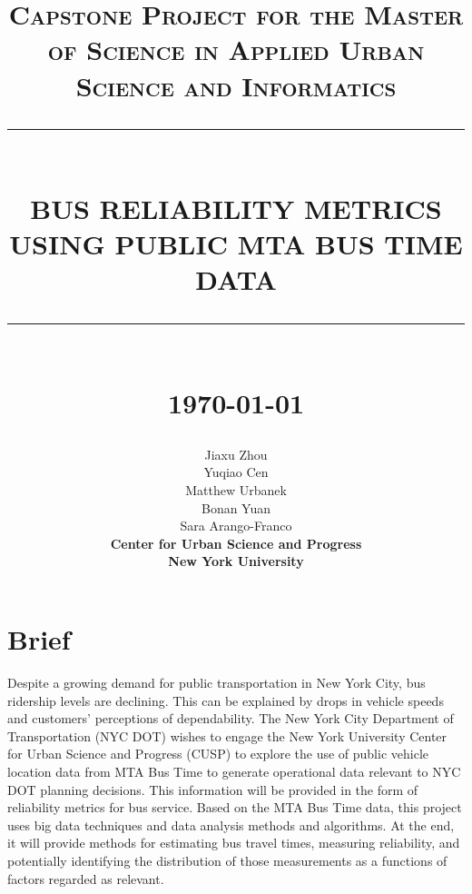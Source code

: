 \documentclass[12pt]{report}
\newcommand{\HRule}[1]{\rule{\linewidth}{#1}}
\begin{document}
\title{ \normalsize \textsc{Capstone Project for the Master of Science in Applied Urban Science and Informatics}
		\\ [2.0cm]
		\HRule{0.5pt} \\
		\LARGE \textbf{\uppercase{Bus Reliability Metrics using Public MTA Bus Time Data}}
		\HRule{2pt} \\ [0.5cm]
		\normalsize \today \vspace*{5\baselineskip}}

\date{}

\author{
		Jiaxu Zhou \\
		Yuqiao Cen \\
		Matthew Urbanek \\
		Bonan Yuan \\
		Sara Arango-Franco \\ 
		\textbf{Center for Urban Science and Progress} \\
		\textbf{New York University}}

\maketitle
\tableofcontents
\newpage

\sectionfont{\scshape}


\section*{Brief}

        Despite a growing demand for public transportation in New York City, bus ridership levels are declining. This can be explained by drops in vehicle speeds and customers' perceptions of dependability. The New York City Department of Transportation (NYC DOT) wishes to engage the New York University Center for Urban Science and Progress (CUSP) to explore the use of public vehicle location data from MTA Bus Time to generate operational data relevant to NYC DOT planning decisions. This information will be provided in the form of reliability metrics for bus service.
        Based on the MTA Bus Time data, this project uses big data techniques and data analysis methods and algorithms. At the end, it will provide methods for estimating bus travel times, measuring reliability, and potentially identifying the distribution of those measurements as a functions of factors regarded as relevant.
        
\end{document}
